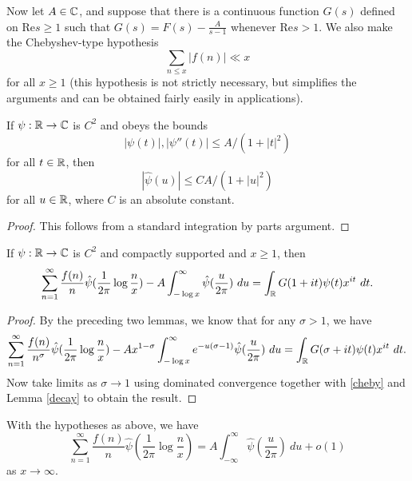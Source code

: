 Now let $A \in \C$, and suppose that there is a continuous function $G(s)$ defined on $\mathrm{Re} s \geq 1$ such that $G(s) = F(s) - \frac{A}{s-1}$ whenever $\mathrm{Re} s > 1$.  We also make the Chebyshev-type hypothesis
\begin{equation}\label{cheby}
\sum_{n \leq x} |f(n)| \ll x
\end{equation}
for all $x \geq 1$ (this hypothesis is not strictly necessary, but simplifies the arguments and can be obtained fairly easily in applications).



\begin{lemma}\label{decay}  If $\psi:\R \to \C$ is $C^2$ and obeys the bounds
  $$ |\psi(t)|, |\psi''(t)| \leq A / (1 + |t|^2)$$
  for all $t \in \R$, then
$$ |\hat \psi(u)| \leq C A / (1+|u|^2)$$
for all $u \in \R$, where $C$ is an absolute constant.
\end{lemma}



\begin{proof} This follows from a standard integration by parts argument.
\end{proof}



\begin{lemma}\label{limiting}  If $\psi: \R \to \C$ is $C^2$ and compactly supported and $x \geq 1$, then
$$ \sum_{n=1}^\infty \frac{f(n)}{n} \hat \psi( \frac{1}{2\pi} \log \frac{n}{x} ) - A \int_{-\log x}^\infty \hat \psi(\frac{u}{2\pi})\ du =  \int_\R G(1+it) \psi(t) x^{it}\ dt.$$
\end{lemma}



\begin{proof}
 By the preceding two lemmas, we know that for any $\sigma>1$, we have
  $$ \sum_{n=1}^\infty \frac{f(n)}{n^\sigma} \hat \psi( \frac{1}{2\pi} \log \frac{n}{x} ) - A x^{1-\sigma} \int_{-\log x}^\infty e^{-u(\sigma-1)} \hat \psi(\frac{u}{2\pi})\ du =  \int_\R G(\sigma+it) \psi(t) x^{it}\ dt.$$
  Now take limits as $\sigma \to 1$ using dominated convergence together with \eqref{cheby} and Lemma \ref{decay} to obtain the result.
\end{proof}



\begin{corollary}\label{limiting-cor}  With the hypotheses as above, we have
  $$ \sum_{n=1}^\infty \frac{f(n)}{n} \hat \psi( \frac{1}{2\pi} \log \frac{n}{x} ) = A \int_{-\infty}^\infty \hat \psi(\frac{u}{2\pi})\ du + o(1)$$
  as $x \to \infty$.
\end{corollary}



